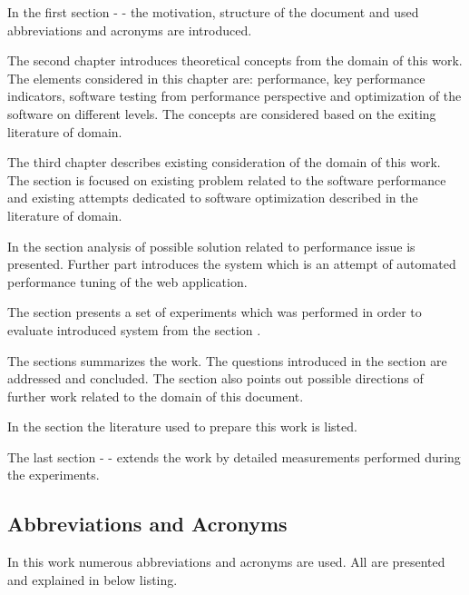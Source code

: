 \documentclass[12pt,a4paper]{article}
\begin{document}
In the first section - \textit{} - the motivation, structure of the document and used abbreviations and acronyms are introduced. 

The second chapter \textit{} introduces theoretical concepts from the domain of this work. The elements considered in this chapter are: performance, key performance indicators, software testing from performance perspective and optimization of the software on different levels. The concepts are considered based on the exiting literature of domain. 
  
The third chapter \textit{} describes existing consideration of the domain of this work. The section is focused on existing problem related to the software performance and existing attempts    dedicated to software optimization described in the literature of domain.

In the section \textit{} analysis of possible solution related to performance issue is presented. Further part introduces the system which is an attempt of automated performance tuning of the web application.

The section \textit{} presents a set of experiments which was performed in order to evaluate introduced system from the section \textit{}. 

The \textit{} sections summarizes the work. The questions introduced in the section \textit{} are addressed and concluded. The section also points out possible directions of further work related to the domain of this document. 

In the section \textit{} the literature used to prepare this work is listed.

The last section - \textit{} - extends the work by detailed measurements performed during the experiments. 

\pagebreak
\subsection{Abbreviations and Acronyms}
In this work numerous abbreviations and acronyms are used. All are presented and explained in below listing.

\vspace{0.3cm}
\end{document}
